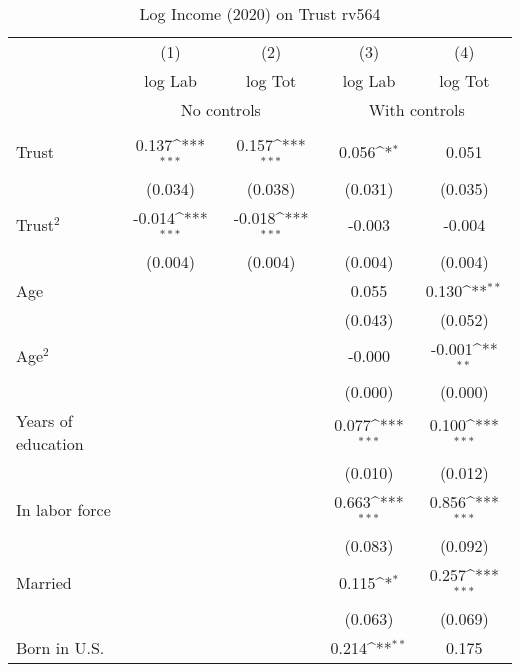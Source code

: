 \begin{table}[htbp]\centering
\def\sym#1{\ifmmode^{#1}\else\(^{#1}\)\fi}
\caption{Log Income (2020) on Trust rv564}
\begin{tabular}{l*{4}{c}}
\toprule
          &\multicolumn{1}{c}{(1)}&\multicolumn{1}{c}{(2)}&\multicolumn{1}{c}{(3)}&\multicolumn{1}{c}{(4)}\\
          &\multicolumn{1}{c}{log Lab}&\multicolumn{1}{c}{log Tot}&\multicolumn{1}{c}{log Lab}&\multicolumn{1}{c}{log Tot}\\
& \multicolumn{2}{c}{No controls} & \multicolumn{2}{c}{With controls} \\\\ \cmidrule(lr){2-3}\cmidrule(lr){4-5}
Trust     &    0.137\sym{***}&    0.157\sym{***}&    0.056\sym{*}  &    0.051         \\
          &  (0.034)         &  (0.038)         &  (0.031)         &  (0.035)         \\
Trust$^{2}$&   -0.014\sym{***}&   -0.018\sym{***}&   -0.003         &   -0.004         \\
          &  (0.004)         &  (0.004)         &  (0.004)         &  (0.004)         \\
Age       &                  &                  &    0.055         &    0.130\sym{**} \\
          &                  &                  &  (0.043)         &  (0.052)         \\
Age$^{2}$ &                  &                  &   -0.000         &   -0.001\sym{**} \\
          &                  &                  &  (0.000)         &  (0.000)         \\
Years of education&                  &                  &    0.077\sym{***}&    0.100\sym{***}\\
          &                  &                  &  (0.010)         &  (0.012)         \\
In labor force&                  &                  &    0.663\sym{***}&    0.856\sym{***}\\
          &                  &                  &  (0.083)         &  (0.092)         \\
Married   &                  &                  &    0.115\sym{*}  &    0.257\sym{***}\\
          &                  &                  &  (0.063)         &  (0.069)         \\
Born in U.S.&                  &                  &    0.214\sym{**} &    0.175         \\

\end{tabular}
\end{table}
